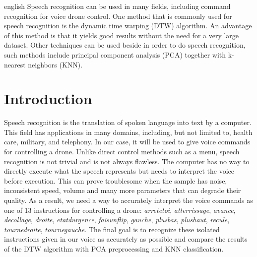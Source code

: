 \documentclass[%
  report,%
  10pt,%
  a4paper,%
  fleqn,%
  oneside,%
  sumario = tradicional,%
  chapter = TITLE,%
  section = TITLE,%
]{abntex2}
\author{
  21906085\\
  Duc Thang, NGUYEN\\
  \texttt{duc-thang.nguyen@univ-tlse3.fr}
  \and
   21902771\\
  Clement, POULL\\
  \texttt{clement.poull@univ-tlse3.fr}
}
\begin{document}
\pretextual%

\begin{paginadetitulo}%

\begin{ambienteresumo}[Abstract]%
\begin{otherlanguage*}{english}%
Speech recognition can be used in many fields, including command recognition for voice drone control.
One method that is commonly used for speech recognition is the dynamic time warping (DTW) algorithm. An advantage of this method is that it yields good results without the need for a very large dataset.
Other techniques can be used beside in order to do speech recognition, such methods include principal component analysis (PCA) together with k-nearest neighbors (KNN).
\end{otherlanguage*}
\end{ambienteresumo}

\end{paginadetitulo}

\textual%

\section{Introduction}\label{sec:intro}

Speech recognition is the translation of spoken language into text by a computer.
This field has applications in many domains, including, but not limited to, health care, military, and telephony.
In our case, it will be used to give voice commands for controlling a drone.
Unlike direct control methods such as a menu, speech recognition is not trivial and is not always flawless.
The computer has no way to directly execute what the speech represents but needs to interpret the voice before execution.
This can prove troublesome when the sample has noise, inconsistent speed, volume and many more parameters that can degrade their quality.
As a result, we need a way to accurately interpret the voice commands as one of 13 instructions for controlling a drone: \textit{arretetoi}, \textit{atterrissage}, \textit{avance}, \textit{decollage}, \textit{droite}, \textit{etatdurgence}, \textit{faisunflip}, \textit{gauche}, \textit{plusbas}, \textit{plushaut}, \textit{recule}, \textit{tournedroite}, \textit{tournegauche}.
The final goal is to recognize these isolated instructions given in our voice as accurately as possible and compare the results of the DTW algorithm with PCA preprocessing and KNN classification.
\end{document}
